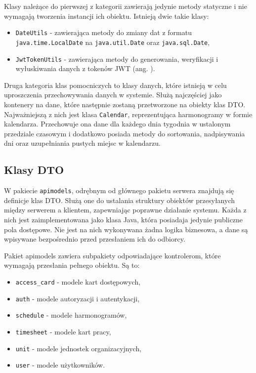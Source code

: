 Klasy należące do pierwszej z kategorii zawierają jedynie metody statyczne i nie wymagają tworzenia instancji ich obiektu. Istnieją dwie takie klasy:
\begin{itemize}
    \item \texttt{DateUtils} - zawierająca metody do zmiany dat z formatu \texttt{java.time.LocalDate} na \texttt{java.util.Date} oraz \texttt{java.sql.Date},
    \item \texttt{JwtTokenUtils} - zawierająca metody do generowania, weryfikacji i wyłuskiwania danych z tokenów JWT (ang. ).
\end{itemize}

Druga kategoria klas pomocniczych to klasy danych, które istnieją w celu uproszczenia przechowywania danych w systemie. Służą najczęściej jako kontenery na dane, które następnie zostaną przetworzone na obiekty klas DTO. Najważniejszą z nich jest klasa \texttt{Calendar}, reprezentująca harmonogramy w formie kalendarza. Przechowuje ona dane dla każdego dnia tygodnia w ustalonym przedziale czasowym i dodatkowo posiada metody do sortowania, nadpisywania dni oraz uzupełniania pustych miejsc w kalendarzu.

\subsection{Klasy DTO}

W pakiecie \texttt{apimodels}, odrębnym od głównego pakietu serwera znajdują się definicje klas DTO. Służą one do ustalania struktury obiektów przesyłanych między serwerem a klientem, zapewniając poprawne działanie systemu. Każda z nich jest zaimplementowana jako klasa Java, która posiadaja jedynie publiczne pola dostępowe. Nie jest na nich wykonywana żadna logika biznesowa, a dane są wpisywane bezpośrednio przed przesłaniem ich do odbiorcy.

Pakiet apimodels zawiera subpakiety odpowiadające kontrolerom, które wymagają przesłania pełnego obiektu. Są to:
\begin{itemize}
    \item \texttt{access\_card} - modele kart dostępowych,
    \item \texttt{auth} - modele autoryzacji i autentykacji,
    \item \texttt{schedule} - modele harmonogramów,
    \item \texttt{timesheet} - modele kart pracy,
    \item \texttt{unit} - modele jednostek organizacyjnych,
    \item \texttt{user} - modele użytkowników.
\end{itemize}

